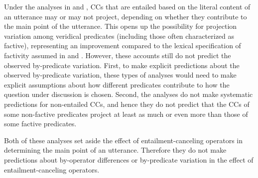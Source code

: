 \documentclass[a4paper,12pt,twoside]{article}
\begin{document}
    Under the analyses in \citealt{abrusan_predicting_2011} and \citealt{simons_best_2017}, CCs that are entailed based on the literal content of an utterance may or may not project, depending on whether they contribute to the main point of the utterance. This opens up the possibility for projection variation among veridical predicates (including those often characterized as factive), representing an improvement compared to the lexical specification of factivity assumed in \citealt{heim_projection_1983} and \citealt{van_der_sandt_presupposition_1992}. However, these accounts still do not predict the observed by-predicate variation.
    First, to make explicit predictions about the observed by-predicate variation, these types of analyses would need to make explicit assumptions about how different predicates contribute to how the question under discussion is chosen.
    Second, the analyses do not make systematic predictions for non-entailed CCs, and hence they do not predict that the CCs of some non-factive predicates project at least as much or even more than those of some factive predicates.

    Both of these analyses set aside the effect of entailment-canceling operators in determining the main point of an utterance. Therefore they do not make predictions about by-operator differences or by-predicate variation in the effect of entailment-canceling operators.


\subsubsection{\citealt{schlenker_triggering_2021}}
\end{document}
